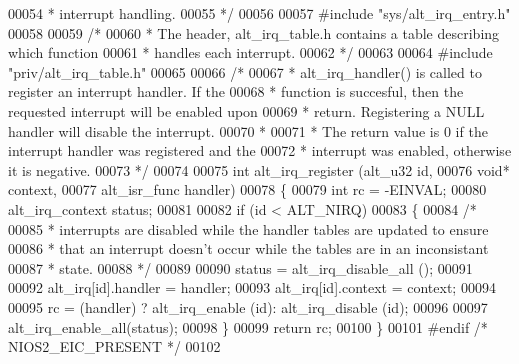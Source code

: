 \begin{DoxyCode}
00054 \textcolor{comment}{ * interrupt handling.}
00055 \textcolor{comment}{ */}
00056 
00057 \textcolor{preprocessor}{#include "sys/alt_irq_entry.h"}
00058 
00059 \textcolor{comment}{/*}
00060 \textcolor{comment}{ * The header, alt\_irq\_table.h contains a table describing which function}
00061 \textcolor{comment}{ * handles each interrupt.}
00062 \textcolor{comment}{ */}
00063 
00064 \textcolor{preprocessor}{#include "priv/alt_irq_table.h"}
00065 
00066 \textcolor{comment}{/*}
00067 \textcolor{comment}{ * alt\_irq\_handler() is called to register an interrupt handler. If the }
00068 \textcolor{comment}{ * function is succesful, then the requested interrupt will be enabled upon }
00069 \textcolor{comment}{ * return. Registering a NULL handler will disable the interrupt.}
00070 \textcolor{comment}{ *}
00071 \textcolor{comment}{ * The return value is 0 if the interrupt handler was registered and the }
00072 \textcolor{comment}{ * interrupt was enabled, otherwise it is negative.}
00073 \textcolor{comment}{ */}
00074  
00075 \textcolor{keywordtype}{int} alt_irq_register (alt_u32 \textcolor{keywordtype}{id}, 
00076                       \textcolor{keywordtype}{void}* context, 
00077                       alt_isr_func handler)
00078 \{
00079   \textcolor{keywordtype}{int} rc = -EINVAL;  
00080   alt_irq_context status;
00081 
00082   \textcolor{keywordflow}{if} (\textcolor{keywordtype}{id} < ALT_NIRQ)
00083   \{
00084     \textcolor{comment}{/* }
00085 \textcolor{comment}{     * interrupts are disabled while the handler tables are updated to ensure}
00086 \textcolor{comment}{     * that an interrupt doesn't occur while the tables are in an inconsistant}
00087 \textcolor{comment}{     * state.}
00088 \textcolor{comment}{     */}
00089 
00090     status = alt_irq_disable_all ();
00091 
00092     alt_irq[id].handler = handler;
00093     alt_irq[id].context = context;
00094 
00095     rc = (handler) ? alt_irq_enable (\textcolor{keywordtype}{id}): alt_irq_disable (\textcolor{keywordtype}{id});
00096 
00097     alt_irq_enable_all(status);
00098   \}
00099   \textcolor{keywordflow}{return} rc; 
00100 \}
00101 \textcolor{preprocessor}{#endif }\textcolor{comment}{/* NIOS2\_EIC\_PRESENT */}\textcolor{preprocessor}{}
00102 
\end{DoxyCode}

